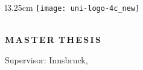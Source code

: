 
\pagestyle{empty}


\begin{titlepage}
\rule{0mm}{1mm}
\vspace*{10mm}
\begin{wrapfigure}{l}{3.25cm}
    \texttt{[image: uni-logo-4c\_new]}
\end{wrapfigure}
\begin{flushright}
    \setlength{\unitlength}{1cm}
    {\large \MOrg \vskip 5mm
    \MInstitution}\\
    \textbf{\large \MGroup}
    \vskip 15mm
    \textbf{\Large M\,A\,S\,T\,E\,R\,\,\,T\,H\,E\,S\,I\,S}
\end{flushright}

\begin{center}
    \vskip 25mm
    {\LARGE\bf \MTitle}
    \vskip 5mm
    \vskip 1cm
    {\large \textbf{\MAuthor}}\vskip 15mm
    \vskip 2cm
    {\large Supervisor: \MSupervisor}
    \vfill
    {\large Innsbruck, \MDate} 
\end{center}
\end{titlepage} 

\ClearShipoutPicture
